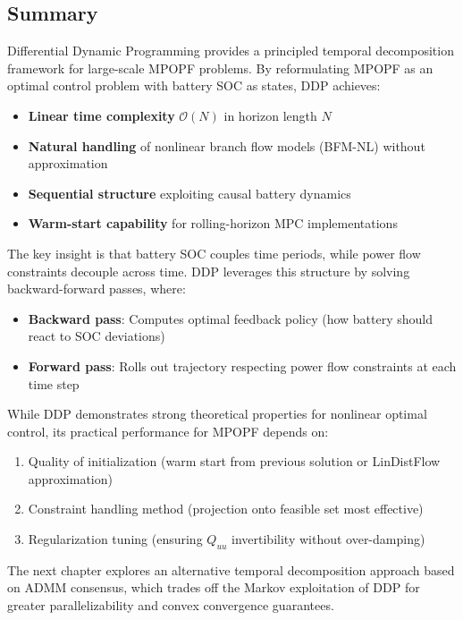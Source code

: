 \subsection{Summary}

Differential Dynamic Programming provides a principled temporal decomposition framework for large-scale MPOPF problems. By reformulating MPOPF as an optimal control problem with battery SOC as states, DDP achieves:

\begin{itemize}
    \item \textbf{Linear time complexity} $\mathcal{O}(N)$ in horizon length $N$
    \item \textbf{Natural handling} of nonlinear branch flow models (BFM-NL) without approximation
    \item \textbf{Sequential structure} exploiting causal battery dynamics
    \item \textbf{Warm-start capability} for rolling-horizon MPC implementations
\end{itemize}

The key insight is that battery SOC couples time periods, while power flow constraints decouple across time. DDP leverages this structure by solving backward-forward passes, where:
\begin{itemize}
    \item \textbf{Backward pass}: Computes optimal feedback policy (how battery should react to SOC deviations)
    \item \textbf{Forward pass}: Rolls out trajectory respecting power flow constraints at each time step
\end{itemize}

While DDP demonstrates strong theoretical properties for nonlinear optimal control, its practical performance for MPOPF depends on:
\begin{enumerate}
    \item Quality of initialization (warm start from previous solution or LinDistFlow approximation)
    \item Constraint handling method (projection onto feasible set most effective)
    \item Regularization tuning (ensuring $Q_{uu}$ invertibility without over-damping)
\end{enumerate}

The next chapter explores an alternative temporal decomposition approach based on ADMM consensus, which trades off the Markov exploitation of DDP for greater parallelizability and convex convergence guarantees.
